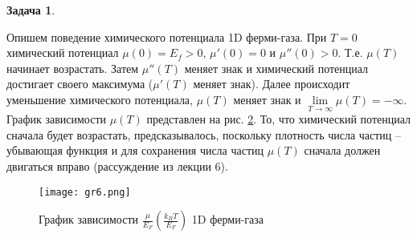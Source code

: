 \documentclass[12pt]{article}
\theoremstyle{definition}
\newtheorem{zad}{Задача}[section]
\begin{document}
\begin{zad}
\begin{figure}
    \label{gr5}
\end{figure}
Опишем поведение химического потенциала 1D ферми-газа. При $T=0$ химический потенциал $\mu(0)=E_f>0$, $\mu'(0)=0$ и $\mu''(0)>0$. Т.е. $\mu(T)$ начинает возрастать. Затем $\mu''(T)$ меняет знак и химический потенциал достигает своего максимума ($\mu'(T)$ меняет знак). Далее происходит уменьшение химического потенциала, $\mu(T)$ меняет знак и $\lim\limits_{T\rightarrow\infty}\mu(T)=-\infty$. График зависимости $\mu(T)$ представлен на рис. \ref{gr6}. То, что химический потенциал сначала будет возрастать, предсказывалось, поскольку плотность числа частиц -- убывающая функция и для сохранения числа частиц $\mu(T)$ сначала должен двигаться вправо (рассуждение из лекции 6).
\begin{figure}
    \centering
    \texttt{[image: gr6.png]}
    \caption{График зависимости $\frac{\mu}{E_F}(\frac{k_BT}{E_F})$ 1D ферми-газа}
    \label{gr6}
\end{figure}
\end{zad}
\end{document}

